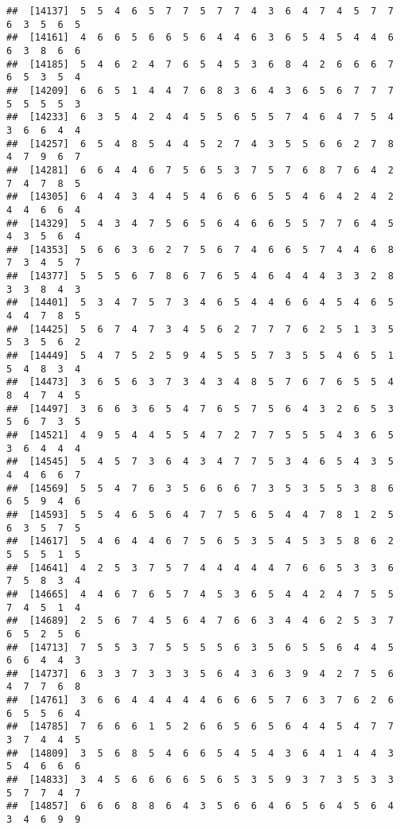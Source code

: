 \documentclass[
]{book}
\begin{document}
\begin{verbatim}
##  [14137]  5  5  4  6  5  7  7  5  7  7  4  3  6  4  7  4  5  7  7  6  3  5  6  5
##  [14161]  4  6  6  5  6  6  5  6  4  4  6  3  6  5  4  5  4  4  6  6  3  8  6  6
##  [14185]  5  4  6  2  4  7  6  5  4  5  3  6  8  4  2  6  6  6  7  6  5  3  5  4
##  [14209]  6  6  5  1  4  4  7  6  8  3  6  4  3  6  5  6  7  7  7  5  5  5  5  3
##  [14233]  6  3  5  4  2  4  4  5  5  6  5  5  7  4  6  4  7  5  4  3  6  6  4  4
##  [14257]  6  5  4  8  5  4  4  5  2  7  4  3  5  5  6  6  2  7  8  4  7  9  6  7
##  [14281]  6  6  4  4  6  7  5  6  5  3  7  5  7  6  8  7  6  4  2  7  4  7  8  5
##  [14305]  6  4  4  3  4  4  5  4  6  6  6  5  5  4  6  4  2  4  2  4  4  6  6  4
##  [14329]  5  4  3  4  7  5  6  5  6  4  6  6  5  5  7  7  6  4  5  4  3  5  6  4
##  [14353]  5  6  6  3  6  2  7  5  6  7  4  6  6  5  7  4  4  6  8  7  3  4  5  7
##  [14377]  5  5  5  6  7  8  6  7  6  5  4  6  4  4  4  3  3  2  8  3  3  8  4  3
##  [14401]  5  3  4  7  5  7  3  4  6  5  4  4  6  6  4  5  4  6  5  4  4  7  8  5
##  [14425]  5  6  7  4  7  3  4  5  6  2  7  7  7  6  2  5  1  3  5  5  3  5  6  2
##  [14449]  5  4  7  5  2  5  9  4  5  5  5  7  3  5  5  4  6  5  1  5  4  8  3  4
##  [14473]  3  6  5  6  3  7  3  4  3  4  8  5  7  6  7  6  5  5  4  8  4  7  4  5
##  [14497]  3  6  6  3  6  5  4  7  6  5  7  5  6  4  3  2  6  5  3  5  6  7  3  5
##  [14521]  4  9  5  4  4  5  5  4  7  2  7  7  5  5  5  4  3  6  5  3  6  4  4  4
##  [14545]  5  4  5  7  3  6  4  3  4  7  7  5  3  4  6  5  4  3  5  4  4  6  6  7
##  [14569]  5  5  4  7  6  3  5  6  6  6  7  3  5  3  5  5  3  8  6  6  5  9  4  6
##  [14593]  5  5  4  6  5  6  4  7  7  5  6  5  4  4  7  8  1  2  5  6  3  5  7  5
##  [14617]  5  4  6  4  4  6  7  5  6  5  3  5  4  5  3  5  8  6  2  5  5  5  1  5
##  [14641]  4  2  5  3  7  5  7  4  4  4  4  4  7  6  6  5  3  3  6  7  5  8  3  4
##  [14665]  4  4  6  7  6  5  7  4  5  3  6  5  4  4  2  4  7  5  5  7  4  5  1  4
##  [14689]  2  5  6  7  4  5  6  4  7  6  6  3  4  4  6  2  5  3  7  6  5  2  5  6
##  [14713]  7  5  5  3  7  5  5  5  5  6  3  5  6  5  5  6  4  4  5  6  6  4  4  3
##  [14737]  6  3  3  7  3  3  3  5  6  4  3  6  3  9  4  2  7  5  6  4  7  7  6  8
##  [14761]  3  6  6  4  4  4  4  4  6  6  6  5  7  6  3  7  6  2  6  6  5  5  6  4
##  [14785]  7  6  6  6  1  5  2  6  6  5  6  5  6  4  4  5  4  7  7  3  7  4  4  5
##  [14809]  3  5  6  8  5  4  6  6  5  4  5  4  3  6  4  1  4  4  3  5  4  6  6  6
##  [14833]  3  4  5  6  6  6  6  5  6  5  3  5  9  3  7  3  5  3  3  5  7  7  4  7
##  [14857]  6  6  6  8  8  6  4  3  5  6  6  4  6  5  6  4  5  6  4  3  4  6  9  9

\end{verbatim}
\end{document}
